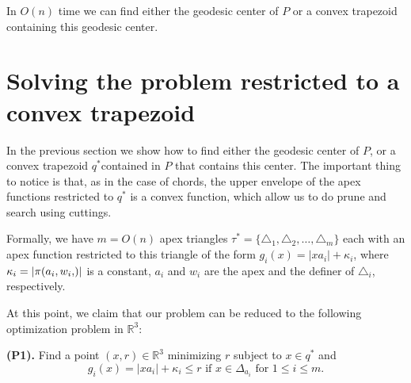 \documentclass[a4paper,UKenglish]{lipics}
\newcommand{\g}[2]{\ensuremath{|\pi(#1, #2)|}}
\begin{document}
\begin{lemma}\label{lemma:Finding the convex trapezoid}
In $O(n)$ time we can find either the geodesic center of $P$ or a convex trapezoid containing this geodesic center.
\end{lemma}


\section{Solving the problem restricted to a convex trapezoid}
In the previous section we show how to find either the geodesic center of $P$, or a convex trapezoid $q^*$contained in $P$ that contains this center. The important thing to notice is that, as in the case of chords, the upper envelope of the apex functions restricted to $q^*$ is a convex function, which allow us to do prune and search using cuttings.

Formally, we have $m = O(n)$ apex triangles $\tau^* = \{\triangle_{1}, \triangle_{2}, \ldots, \triangle_{m}\}$ each with an apex function restricted to this triangle of the form $g_i(x) = |x a_i| + \kappa_i$, where $\kappa_i = \g{a_i, w_i}$ is a constant, $a_i$ and $w_i$ are the apex and the definer of $\triangle_i$, respectively.

At this point, we claim that our problem can be reduced to the following optimization problem in $\mathbb{R}^3$:

\textbf{(P1).} Find a point $(x,r)\in \mathbb{R}^3$ minimizing $r$ subject to $x\in q^*$ and
$$\text{$g_i(x) = |x a_i| + \kappa_i \leq r$ if $x\in \Delta_{a_i}$ for $1\leq i \leq m$}.$$
\end{document}
